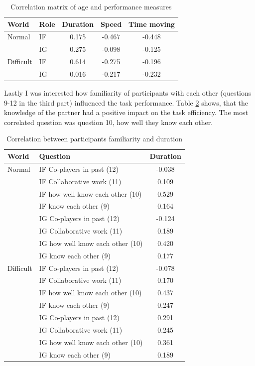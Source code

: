 \begin{table}[!htbp]
 \centering
\begin{tabular}{llccc}
\toprule
World & Role  & Duration & Speed & Time moving  \\
\midrule
Normal 	& IF & 0.175 & -0.467 & -0.448\\
 		& IG & 0.275 & -0.098 & -0.125\\
\midrule
Difficult& IF & 0.614 &	-0.275 &-0.196\\
 		& IG  & 0.016 &	-0.217 &-0.232\\
\bottomrule
\end{tabular}
\caption{Correlation matrix of age and performance measures}
\label{tab:demfactors-age}
\end{table}

Lastly I was interested how familiarity of participants with each other (questions 9-12 in the third part) influenced the task performance. Table \ref{tab:demfactors-famother} shows, that the knowledge of the partner had a positive impact on the task efficiency. The most correlated question was question 10, how well they know each other.

\begin{table}[!htbp]
 \centering
\begin{tabular}{llc}
\toprule
World & Question  & Duration \\
\midrule
Normal 	& IF Co-players in past (12) 	& -0.038\\
 		& IF Collaborative work 	(11)		& 0.109	 \\
 		& IF how well know each other (10)		& 0.529\\
 		& IF know each other (9)			& 0.164	\\
 		& IG Co-players in past (12) 	& -0.124\\
 		& IG Collaborative work 	(11)		& 0.189	 \\
 		& IG how well know each other (10)		& 0.420\\
 		& IG know each other (9)			& 0.177	\\
\midrule
Difficult& IF Co-players in past (12) 	& -0.078\\
 		& IF Collaborative work 	(11)		& 0.170	 \\
  		& IF how well know each other (10)		& 0.437\\
 		& IF know each other (9)			& 0.247	\\
 		& IG Co-players in past (12) 	& 0.291\\
 		& IG Collaborative work 	(11)		& 0.245	 \\
 		& IG how well know each other (10)		& 0.361\\
 		& IG know each other (9)			& 0.189	\\
\bottomrule
\end{tabular}
\caption{Correlation between participants familiarity and duration}
\label{tab:demfactors-famother}
\end{table}

